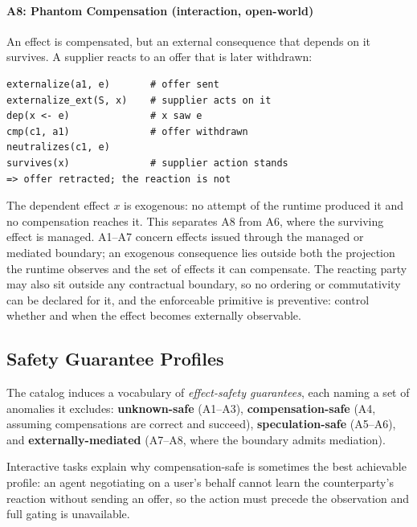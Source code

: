 \documentclass{article}
\begin{document}
\paragraph{A8: Phantom Compensation (interaction, open-world)}
An effect is compensated, but an external consequence that depends
on it survives. A supplier reacts to an offer that is later withdrawn:
\par\vspace{2pt}\noindent\begin{minipage}{\linewidth}
\begingroup\footnotesize\begin{verbatim}
externalize(a1, e)       # offer sent
externalize_ext(S, x)    # supplier acts on it
dep(x <- e)              # x saw e
cmp(c1, a1)              # offer withdrawn
neutralizes(c1, e)
survives(x)              # supplier action stands
=> offer retracted; the reaction is not
\end{verbatim}\endgroup
\end{minipage}\par\noindent
The dependent effect $x$ is exogenous: no attempt of the runtime produced it
and no compensation reaches it. This separates A8 from A6, where the
surviving effect is managed. A1--A7 concern effects issued through the managed or mediated boundary; an
exogenous consequence lies outside both the projection the runtime observes
and the set of effects it can compensate. The reacting party may
also sit outside any contractual boundary, so no ordering or commutativity
can be declared for it, and the enforceable primitive is preventive:
control whether and when the effect becomes externally observable.



\subsection{Safety Guarantee Profiles}
\label{sec:levels}

The catalog induces a vocabulary of \emph{effect-safety guarantees}, each
naming a set of anomalies it excludes: \textbf{unknown-safe} (A1--A3),
\textbf{compensation-safe} (A4, assuming compensations are correct and
succeed), \textbf{speculation-safe} (A5--A6), and
\textbf{externally-mediated} (A7--A8, where the boundary admits mediation).

Interactive tasks explain why compensation-safe is sometimes the best
achievable profile: an agent negotiating on a user's behalf cannot learn the
counterparty's reaction without sending an offer, so the action must precede
the observation and full gating is unavailable.
\end{document}
